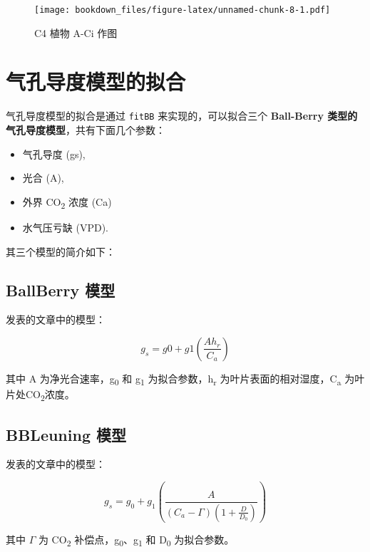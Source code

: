 \documentclass[]{krantz}
\providecommand{\tightlist}{%
  \setlength{\itemsep}{0pt}\setlength{\parskip}{0pt}}
\theoremstyle{definition}
\theoremstyle{definition}
\theoremstyle{definition}
\theoremstyle{remark}
\begin{document}
\begin{figure}
\centering
\texttt{[image: bookdown\_files/figure-latex/unnamed-chunk-8-1.pdf]}
\caption{\label{fig:unnamed-chunk-8}C4 植物 A-Ci 作图}
\end{figure}

\cleardoublepage

\chapter{气孔导度模型的拟合}\label{stomotal_sim}

气孔导度模型的拟合是通过 \texttt{fitBB} 来实现的，可以拟合三个
\textbf{Ball-Berry 类型的气孔导度模型}，共有下面几个参数：

\begin{itemize}
\tightlist
\item
  气孔导度 (gs),
\item
  光合 (A),
\item
  外界 CO\textsubscript{2} 浓度 (Ca)
\item
  水气压亏缺 (VPD).
\end{itemize}

其三个模型的简介如下：

\section{BallBerry 模型}\label{ballberry}

\citet{Ball1987A} 发表的文章中的模型：

\begin{equation}
g_s = g0 + g1(\frac{A h_r}{C_a})
\label{eq:ballberry}
\end{equation}

其中 A 为净光合速率，g\textsubscript{0} 和 g\textsubscript{1}
为拟合参数，h\textsubscript{r} 为叶片表面的相对湿度，C\textsubscript{a}
为叶片处CO\textsubscript{2}浓度。

\section{BBLeuning 模型}\label{bbleuning}

\citet{leuning1995a} 发表的文章中的模型：

\begin{equation}
g_s = g_0 + g_1(\frac{A}{(C_a - \Gamma)(1 + \frac{D}{D_0})})
\label{eq:BBLeuning}
\end{equation}

其中 \(\Gamma\) 为 CO\textsubscript{2}
补偿点，g\textsubscript{0}、g\textsubscript{1} 和 D\textsubscript{0}
为拟合参数。
\end{document}
